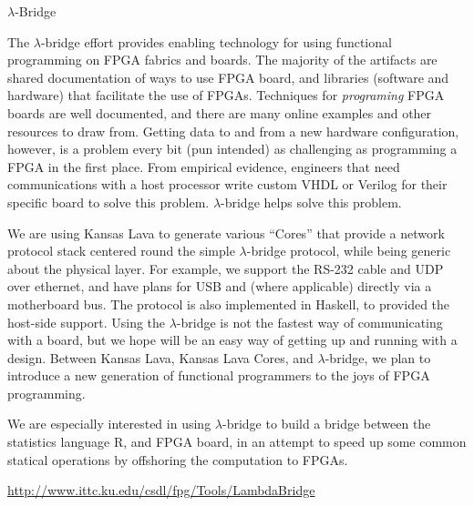 \begin{hcarentry}{$\lambda$-Bridge}
\label{lambdabridge}
\makeheader

The $\lambda$-bridge effort provides enabling technology for using functional
programming on FPGA fabrics and boards. The majority of the artifacts are
shared documentation of ways to use FPGA board, and libraries (software and
hardware) that facilitate the use of FPGAs.
Techniques for {\em programing\/} FPGA boards are well documented, and there
are many online examples and other resources to draw from. Getting data to and
from a new hardware configuration, however, is a problem every bit (pun
intended) as challenging as programming a FPGA in the first place. From
empirical evidence, engineers that need communications with a host processor
write custom VHDL or Verilog for their specific board to solve this problem.
$\lambda$-bridge helps solve this problem.

We are using Kansas Lava to generate various ``Cores'' that provide
a network protocol stack centered
round the simple $\lambda$-bridge protocol, while being generic
about the physical layer.
For example, we support the RS-232 cable and UDP over ethernet, 
and have plans for USB and (where applicable) directly via a motherboard bus. 
The protocol is also implemented in Haskell, to provided the host-side
support.
Using the $\lambda$-bridge is not the fastest way of communicating
with a board, but we hope will be an easy way of getting up and running
with a design.
Between Kansas Lava, Kansas Lava Cores, and $\lambda$-bridge, we plan
to introduce a new generation of functional programmers to the joys
of FPGA programming.

We are especially interested in using $\lambda$-bridge to build
a bridge between the statistics language R, and FPGA board,
in an attempt to speed up some common statical operations
by offshoring the computation to FPGAs.

\FurtherReading
  \url{http://www.ittc.ku.edu/csdl/fpg/Tools/LambdaBridge}
\end{hcarentry}
